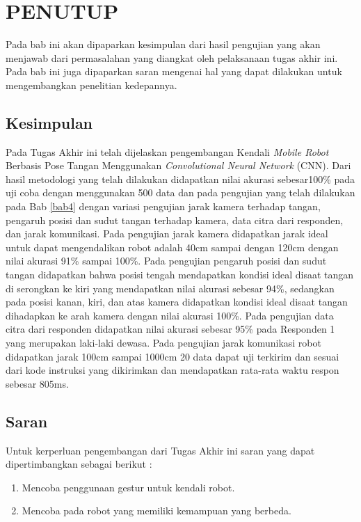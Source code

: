\chapter{PENUTUP}
\label{chap:penutup}

Pada bab ini akan dipaparkan kesimpulan dari hasil pengujian yang akan menjawab dari permasalahan yang diangkat oleh pelaksanaan tugas akhir ini. Pada bab ini juga dipaparkan saran mengenai hal yang dapat dilakukan untuk mengembangkan penelitian kedepannya.

\section{Kesimpulan}
\label{sec:kesimpulan}

 Pada Tugas Akhir ini telah dijelaskan pengembangan Kendali \emph{Mobile Robot} Berbasis Pose Tangan Menggunakan \emph{Convolutional Neural Network} (CNN). Dari hasil metodologi yang telah dilakukan didapatkan nilai akurasi sebesar100\% pada uji coba dengan menggunakan 500 data dan pada pengujian yang telah dilakukan pada Bab \ref{bab4} dengan variasi pengujian jarak kamera terhadap tangan, pengaruh posisi dan sudut tangan terhadap kamera, data citra dari responden, dan jarak komunikasi. Pada pengujian jarak kamera didapatkan jarak ideal untuk dapat mengendalikan robot adalah 40cm sampai dengan 120cm dengan nilai akurasi 91\% sampai 100\%. Pada pengujian pengaruh posisi dan sudut tangan didapatkan bahwa posisi tengah mendapatkan kondisi ideal disaat tangan di serongkan ke kiri yang mendapatkan nilai akurasi sebesar 94\%, sedangkan pada posisi kanan, kiri, dan atas kamera didapatkan kondisi ideal disaat tangan dihadapkan ke arah kamera dengan nilai akurasi 100\%. Pada pengujian data citra dari responden didapatkan nilai akurasi sebesar 95\% pada Responden 1 yang merupakan laki-laki dewasa. Pada pengujian jarak komunikasi robot didapatkan jarak 100cm sampai 1000cm 20 data dapat uji terkirim dan sesuai dari kode instruksi yang dikirimkan dan mendapatkan rata-rata waktu respon sebesar 805ms.

\section{Saran}
\label{chap:saran}

Untuk kerperluan pengembangan dari Tugas Akhir ini saran yang dapat dipertimbangkan sebagai berikut :

\begin{enumerate}[nolistsep]

  \item Mencoba penggunaan gestur untuk kendali robot.
  \item Mencoba pada robot yang memiliki kemampuan yang berbeda. 


\end{enumerate}
